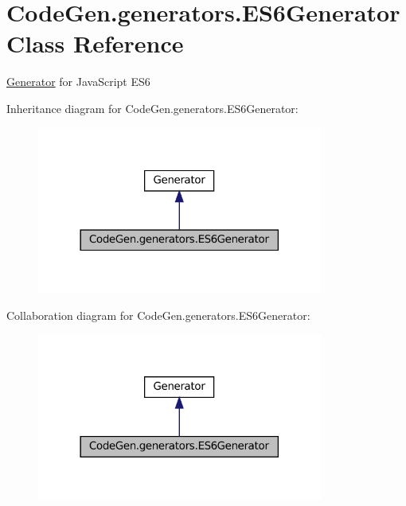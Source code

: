 \hypertarget{classCodeGen_1_1generators_1_1ES6Generator}{}\section{Code\+Gen.\+generators.\+E\+S6\+Generator Class Reference}
\label{classCodeGen_1_1generators_1_1ES6Generator}


\mbox{\hyperlink{classCodeGen_1_1generators_1_1Generator}{Generator}} for Java\+Script E\+S6  




Inheritance diagram for Code\+Gen.\+generators.\+E\+S6\+Generator\+:
\nopagebreak
\begin{figure}[H]
\begin{center}
\leavevmode
\includegraphics[width=266pt]{classCodeGen_1_1generators_1_1ES6Generator__inherit__graph}
\end{center}
\end{figure}


Collaboration diagram for Code\+Gen.\+generators.\+E\+S6\+Generator\+:
\nopagebreak
\begin{figure}[H]
\begin{center}
\leavevmode
\includegraphics[width=266pt]{classCodeGen_1_1generators_1_1ES6Generator__coll__graph}
\end{center}
\end{figure}
